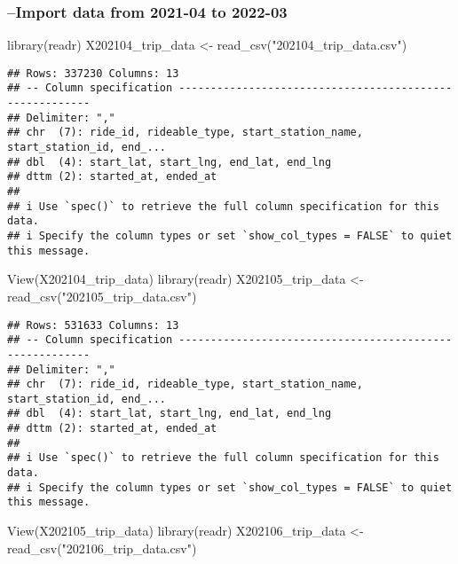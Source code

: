 \documentclass[
]{article}
\newenvironment{Shaded}{\begin{snugshade}}{\end{snugshade}}
\newcommand{\FunctionTok}[1]{\textcolor[rgb]{0.00,0.00,0.00}{#1}}
\newcommand{\NormalTok}[1]{#1}
\newcommand{\OtherTok}[1]{\textcolor[rgb]{0.56,0.35,0.01}{#1}}
\newcommand{\StringTok}[1]{\textcolor[rgb]{0.31,0.60,0.02}{#1}}
\begin{document}
\hypertarget{import-data-from-2021-04-to-2022-03}{%
\subsubsection{--Import data from 2021-04 to
2022-03}\label{import-data-from-2021-04-to-2022-03}}

\begin{Shaded}
\begin{Highlighting}[]
\FunctionTok{library}\NormalTok{(readr)}
\NormalTok{X202104\_trip\_data }\OtherTok{\textless{}{-}} \FunctionTok{read\_csv}\NormalTok{(}\StringTok{"202104\_trip\_data.csv"}\NormalTok{)}
\end{Highlighting}
\end{Shaded}

\begin{verbatim}
## Rows: 337230 Columns: 13
## -- Column specification --------------------------------------------------------
## Delimiter: ","
## chr  (7): ride_id, rideable_type, start_station_name, start_station_id, end_...
## dbl  (4): start_lat, start_lng, end_lat, end_lng
## dttm (2): started_at, ended_at
## 
## i Use `spec()` to retrieve the full column specification for this data.
## i Specify the column types or set `show_col_types = FALSE` to quiet this message.
\end{verbatim}

\begin{Shaded}
\begin{Highlighting}[]
\FunctionTok{View}\NormalTok{(X202104\_trip\_data)}
\FunctionTok{library}\NormalTok{(readr)}
\NormalTok{X202105\_trip\_data }\OtherTok{\textless{}{-}} \FunctionTok{read\_csv}\NormalTok{(}\StringTok{"202105\_trip\_data.csv"}\NormalTok{)}
\end{Highlighting}
\end{Shaded}

\begin{verbatim}
## Rows: 531633 Columns: 13
## -- Column specification --------------------------------------------------------
## Delimiter: ","
## chr  (7): ride_id, rideable_type, start_station_name, start_station_id, end_...
## dbl  (4): start_lat, start_lng, end_lat, end_lng
## dttm (2): started_at, ended_at
## 
## i Use `spec()` to retrieve the full column specification for this data.
## i Specify the column types or set `show_col_types = FALSE` to quiet this message.
\end{verbatim}

\begin{Shaded}
\begin{Highlighting}[]
\FunctionTok{View}\NormalTok{(X202105\_trip\_data)}
\FunctionTok{library}\NormalTok{(readr)}
\NormalTok{X202106\_trip\_data }\OtherTok{\textless{}{-}} \FunctionTok{read\_csv}\NormalTok{(}\StringTok{"202106\_trip\_data.csv"}\NormalTok{)}
\end{Highlighting}
\end{Shaded}
\end{document}
